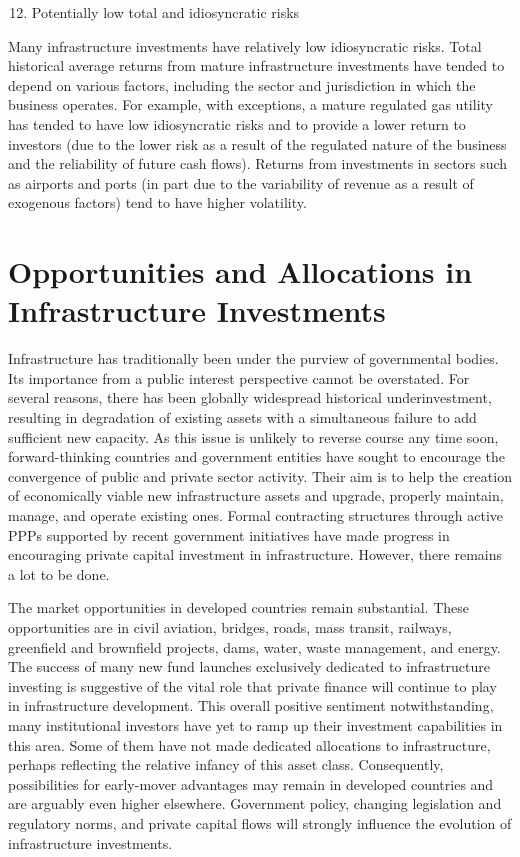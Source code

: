 \documentclass[11pt]{article}
\begin{document}
\begin{enumerate}
  \setcounter{enumi}{11}
  \item Potentially low total and idiosyncratic risks
\end{enumerate}

Many infrastructure investments have relatively low idiosyncratic risks. Total historical average returns from mature infrastructure investments have tended to depend on various factors, including the sector and jurisdiction in which the business operates. For example, with exceptions, a mature regulated gas utility has tended to have low idiosyncratic risks and to provide a lower return to investors (due to the lower risk as a result of the regulated nature of the business and the reliability of future cash flows). Returns from investments in sectors such as airports and ports (in part due to the variability of revenue as a result of exogenous factors) tend to have higher volatility.

\section*{Opportunities and Allocations in Infrastructure Investments}
Infrastructure has traditionally been under the purview of governmental bodies. Its importance from a public interest perspective cannot be overstated. For several reasons, there has been globally widespread historical underinvestment, resulting in degradation of existing assets with a simultaneous failure to add sufficient new capacity. As this issue is unlikely to reverse course any time soon, forward-thinking countries and government entities have sought to encourage the convergence of public and private sector activity. Their aim is to help the creation of economically viable new infrastructure assets and upgrade, properly maintain, manage, and operate existing ones. Formal contracting structures through active PPPs supported by recent government initiatives have made progress in encouraging private capital investment in infrastructure. However, there remains a lot to be done.

The market opportunities in developed countries remain substantial. These opportunities are in civil aviation, bridges, roads, mass transit, railways, greenfield and brownfield projects, dams, water, waste management, and energy. The success of many new fund launches exclusively dedicated to infrastructure investing is suggestive of the vital role that private finance will continue to play in infrastructure development. This overall positive sentiment notwithstanding, many institutional investors have yet to ramp up their investment capabilities in this area. Some of them have not made dedicated allocations to infrastructure, perhaps reflecting the relative infancy of this asset class. Consequently, possibilities for early-mover advantages may remain in developed countries and are arguably even higher elsewhere. Government policy, changing legislation and regulatory norms, and private capital flows will strongly influence the evolution of infrastructure investments.
\end{document}
